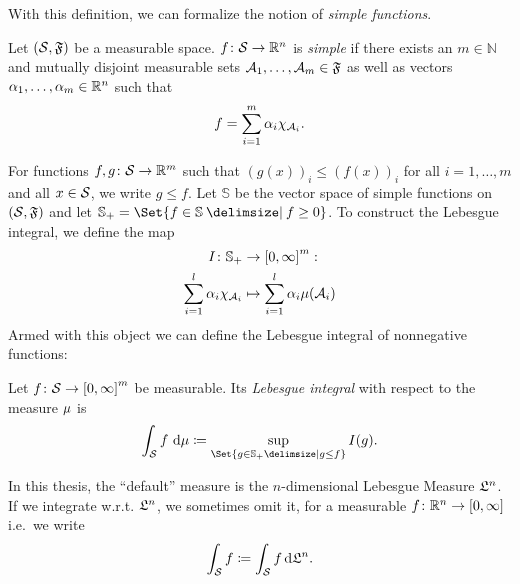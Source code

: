With this definition, we can formalize the notion of \emph{simple functions}.
\begin{definition}%
	\label{def:simple function}
	Let \( (\mathcal{S}, \mathfrak{F}) \) be a measurable space.
	\( f \colon \mathcal{S}\allowbreak \to \mathbb{R}^n \) is \emph{simple} if there exists an \( m \in \mathbb{N} \) and mutually disjoint measurable sets \( \mathcal{A}_{\num{1}}, \dotsc, \mathcal{A}_m \in \mathfrak{F} \) as well as vectors \( \alpha_{\num{1}}, \dotsc, \alpha_m \in \mathbb{R}^n \) such that
	\begin{equation}
		f = \sum_{i=\num{1}}^m \alpha_i \chi_{\mathcal{A}_i}.
	\end{equation}
\end{definition}

For functions \( f, g \colon \mathcal{S} \to \mathbb{R}^m \) such that \( (g(x))_i \leq (f(x))_i \) for all \( i = \num{1}, \dotsc, m \) and all \( x \in \mathcal{S} \), we write \( g \leq f \).
Let \( \mathbb{S} \) be the vector space of simple functions on \( (\mathcal{S}, \mathfrak{F}) \) and let \( \mathbb{S}_+ = \Set{f \in \mathbb{S} \given f \geq \num{0}} \).
To construct the Lebesgue integral, we define the map 
\begin{equation}
	\begin{aligned}
		\map{I}{\mathbb{S}_+&}{\interval{\num{0}}{\infty}^m}:\\
		\sum_{i=\num{1}}^l\alpha_i \CharacteristicFunction{\mathcal{A}_i}&\mapsto \sum_{i=1}^l \alpha_i \mu(\mathcal{A}_i)
	\end{aligned}
\end{equation}
Armed with this object we can define the Lebesgue integral of nonnegative functions:
\begin{definition}%
	\label{def:lebesgue integral}
	Let \( \map{f}{\ASet}{\interval{\num{0}}{\infty}^m} \) be measurable.
	Its \emph{Lebesgue integral} with respect to the measure \( \mu \) is
	\begin{equation}
		\int_{\ASet} f\ \mathrm{d}\Measure \coloneqq \sup_{\Set{g \in \mathbb{S}_+\given g \leq f}} I(g).
	\end{equation}
\end{definition}
In this thesis, the \enquote{default} measure is the \( n \)-dimensional Lebesgue Measure \( \mathfrak{L}^n \).
If we integrate w.r.t. \( \mathfrak{L}^n \), we sometimes omit it, for a measurable \( \map{f}{\R^n}{\interval{\num{0}}{\infty}} \) i.e.\ we write
\begin{equation}
	\int_{\mathcal{S}} f \coloneqq \int_{\mathcal{S}} f\,\mathrm{d}\mathfrak{L}^n.
\end{equation}
